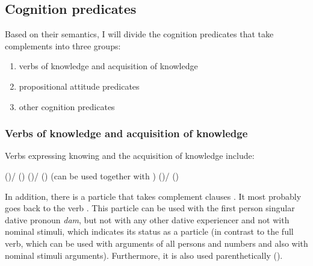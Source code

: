 
\subsection{Cognition predicates}
\label{ssec:Cognition predicates}

Based on their semantics, I will divide the cognition predicates that take complements into three groups:
%
\begin{enumerate}
	\item	verbs of knowledge and acquisition of knowledge
	\item	propositional attitude predicates
	\item	other cognition predicates
\end{enumerate}



\subsubsection{Verbs of knowledge and acquisition of knowledge}
\label{sssec:Verbs of knowledge and acquisition of knowledge}

Verbs expressing knowing and the acquisition of knowledge include:
%
\begin{exe}
	\ex	\label{ex:verbs of knowledge}
	\begin{xlist}
		\ex	{} ()\slash{} () 
		\ex	{} ()\slash{} ()  (can be used together with  )
		\ex	{} ()\slash{} ()  
	\end{xlist}
\end{exe}

In addition, there is a particle   that takes complement clauses . It most probably goes back to the verb . This particle can be used with the first person singular dative pronoun \textit{dam}, but not with any other dative experiencer and not with nominal stimuli, which indicates its status as a particle (in contrast to the full verb, which can be used with arguments of all persons and numbers and also with nominal stimuli arguments). Furthermore, it is also used parenthetically ().


